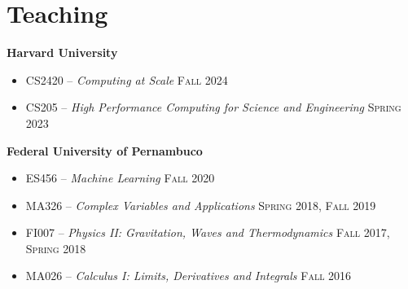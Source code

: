 \documentclass[letterpaper,10pt]{article}
\newcommand{\entry}[4]{

\begin{minipage}[t]{.15\textwidth}
\end{minipage}
\hfill\vline\hfill 
\begin{minipage}[t]{0.95\textwidth}
#2 \hfill \textsc{#1}

\textit{#3}

\footnotesize{#4}
\end{minipage}\\\vspace{.25cm}}
\newcommand{\harv}{Harvard University}
\newcommand{\ufpe}{Federal University of Pernambuco}
\newcommand{\mycomment}[1]{}
\begin{document}
\vspace*{-.25cm}
\section{Teaching}
\textbf{\harv}
\vspace{-0.5em}
\begin{itemize}[label={}]
    \setlength\itemsep{0.1em}
	\item CS2420 -- \textit{Computing at Scale} \hfill\textsc{Fall 2024}
	\item CS205 -- \textit{High Performance Computing for Science and Engineering} \hfill\textsc{Spring 2023}
\end{itemize}
\hspace{1.5em}\textbf{\ufpe} 
\vspace{-0.5em}
\begin{itemize}[label={}]
    \setlength\itemsep{0.1em}
    \item ES456 -- \textit{Machine Learning} \hfill\textsc{Fall 2020}
    \item MA326 -- \textit{Complex Variables and Applications} \hfill\textsc{Spring 2018, Fall 2019}
    \item FI007 -- \textit{Physics II: Gravitation, Waves and Thermodynamics} \hfill\textsc{Fall 2017, Spring 2018}
    \item MA026 -- \textit{Calculus I: Limits, Derivatives and Integrals} \hfill\textsc{Fall 2016} 
\end{itemize}
\vspace*{-.25cm}
\mycomment{
\entry{Spring 2023}{CS205 -- \textbf{High Performance Computing} -- Teaching Fellow}{\harv}{
	I led lab activites, held office hours, assisted the teaching staff on grading assignments, and mentored some of the final projects.
	}

\entry{Fall 2020}{ES456 -- \textbf{Machine Learning} -- Teaching Assistant}{\ufpe}{
	I conducted my own activities and lectures off of my own syllabus. Supported the students developing projects and graded work.
	}

\entry{2018--2019}{MA326 -- \textbf{Complex Variables and Applications} -- Teaching Assistant}{\ufpe}{
	I taught once-a-week sessions to support students in their assignments.
	}

\entry{2017--2018}{FI007 -- \textbf{Physics II: Gravitation, Waves and Thermodynamics} -- Teaching Assistant}{\ufpe}{
	I wrote some extra assignments for students interested in Olympic-level Physics, as well as once-a-week sessions to discuss.
	}

\entry{Fall 2016}{MA026 -- \textbf{Calculus I: Limits, Derivatives and Integrals} -- Teaching Assistant}{\ufpe}{
	I taught once-a-week sessions to support students in their assignments.
	}
}
\end{document}
